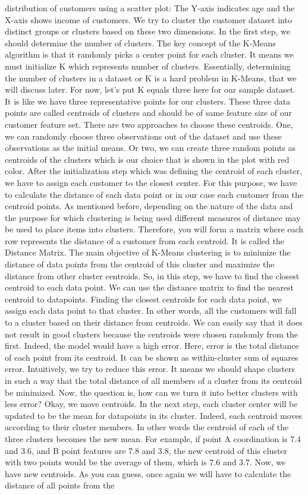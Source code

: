 distribution of customers using a scatter plot: The Y-axis indicates age and the X-axis shows income of customers. We try to cluster the customer dataset into distinct groups or clusters based on these two dimensions. In the first step, we should determine the number of clusters. The key concept of the K-Means algorithm is that it randomly picks a center point for each cluster. It means we must initialize K which represents number of clusters. Essentially, determining the number of clusters in a dataset or K is a hard problem in K-Means, that we will discuss later. For now, let's put K equals three here for our sample dataset. It is like we have three representative points for our clusters. These three data points are called centroids of clusters and should be of same feature size of our customer feature set. There are two approaches to choose these centroids. One, we can randomly choose three observations out of the dataset and use these observations as the initial means. Or two, we can create three random points as centroids of the clusters which is our choice that is shown in the plot with red color. After the initialization step which was defining the centroid of each cluster, we have to assign each customer to the closest center. For this purpose, we have to calculate the distance of each data point or in our case each customer from the centroid points. As mentioned before, depending on the nature of the data and the purpose for which clustering is being used different measures of distance may be used to place items into clusters. Therefore, you will form a matrix where each row represents the distance of a customer from each centroid. It is called the Distance Matrix. The main objective of K-Means clustering is to minimize the distance of data points from the centroid of this cluster and maximize the distance from other cluster centroids. So, in this step, we have to find the closest centroid to each data point. We can use the distance matrix to find the nearest centroid to datapoints. Finding the closest centroids for each data point, we assign each data point to that cluster. In other words, all the customers will fall to a cluster based on their distance from centroids. We can easily say that it does not result in good clusters because the centroids were chosen randomly from the first. Indeed, the model would have a high error. Here, error is the total distance of each point from its centroid. It can be shown as within-cluster sum of squares error. Intuitively, we try to reduce this error. It means we should shape clusters in such a way that the total distance of all members of a cluster from its centroid be minimized. Now, the question is, how can we turn it into better clusters with less error? Okay, we move centroids. In the next step, each cluster center will be updated to be the mean for datapoints in its cluster. Indeed, each centroid moves according to their cluster members. In other words the centroid of each of the three clusters becomes the new mean. For example, if point A coordination is 7.4 and 3.6, and B point features are 7.8 and 3.8, the new centroid of this cluster with two points would be the average of them, which is 7.6 and 3.7. Now, we have new centroids. As you can guess, once again we will have to calculate the distance of all points from the 